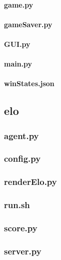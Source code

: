 \documentclass[12pt]{article}
\newcommand{\incFile}[2]{\label{code:#2}\newpage}
\begin{document}
\paragraph{game.py}														\incFile{python}{Clients/pyClient/game.py}
\paragraph{gameSaver.py}												\incFile{python}{Clients/pyClient/gameSaver.py}
\paragraph{GUI.py}															\incFile{python}{Clients/pyClient/GUI.py}
\paragraph{main.py}														\incFile{python}{Clients/pyClient/main.py}
\paragraph{winStates.json}											\incFile{python}{Clients/pyClient/winStates.json}

\subsection{elo}																%
\subsubsection{agent.py}												\incFile{python}{elo/agent.py}
\subsubsection{config.py}												\incFile{python}{elo/config.py}
\subsubsection{renderElo.py}										\incFile{python}{elo/renderElo.py}
\subsubsection{run.sh}													\incFile{sh}{elo/run.sh}
\subsubsection{score.py}												\incFile{python}{elo/score.py}
\subsubsection{server.py}												\incFile{python}{elo/server.py}
\end{document}
